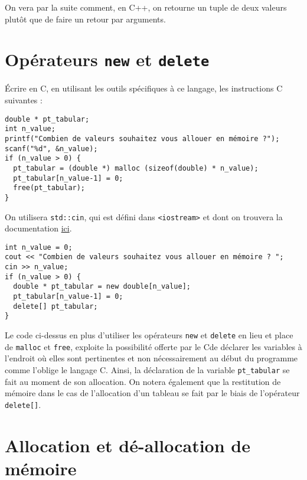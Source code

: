 \documentclass{book}
\newcommand{\inline}[1]{\texttt{#1}}
\newcommand{\cpp}{\mbox{C\vspace{.5em}\protect\raisebox{.2ex}{\footnotesize++~}}}
\begin{document}
On vera par la suite comment, en C++, on retourne un tuple de deux valeurs plutôt que de faire un retour par arguments.

\section{Opérateurs \texttt{new} et \texttt{delete}}

Écrire en \cpp, en utilisant les outils spécifiques à ce langage, les instructions C suivantes :

\begin{verbatim}
double * pt_tabular;
int n_value;
printf("Combien de valeurs souhaitez vous allouer en mémoire ?");
scanf("%d", &n_value);
if (n_value > 0) {
  pt_tabular = (double *) malloc (sizeof(double) * n_value);
  pt_tabular[n_value-1] = 0;
  free(pt_tabular);
}
\end{verbatim}

On utilisera \inline{std::cin}, qui est défini dans \inline{<iostream>} et dont on trouvera la documentation \href{https://en.cppreference.com/w/cpp/io/cin}{ici}.

\begin{correction}

\begin{verbatim}
int n_value = 0;
cout << "Combien de valeurs souhaitez vous allouer en mémoire ? ";
cin >> n_value;
if (n_value > 0) {
  double * pt_tabular = new double[n_value];
  pt_tabular[n_value-1] = 0;
  delete[] pt_tabular;
}
\end{verbatim}

Le code ci-dessus en plus d'utiliser les opérateurs \texttt{new} et \texttt{delete} en lieu et
place de \texttt{malloc} et \texttt{free}, exploite la possibilité offerte par le \cpp de déclarer
les variables à l'endroit où elles sont pertinentes et non nécessairement au
début du programme comme l'oblige le langage C. Ainsi, la déclaration de la
variable \texttt{pt\_tabular} se fait au moment de son allocation. On notera également
que la restitution de mémoire dans le cas de l'allocation d'un tableau se fait
par le biais de l'opérateur \texttt{delete[]}.
\end{correction}


\section{Allocation et dé-allocation de mémoire} \label{ex:sum_exp}
\end{document}
